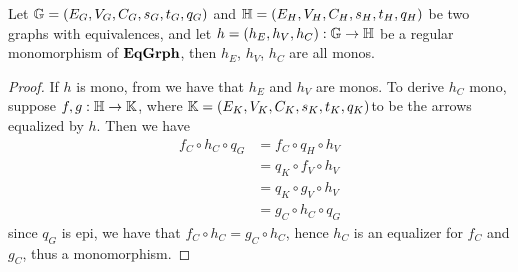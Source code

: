 \begin{cor}\label{cor:regmono}
	Let $\mathbb{G} = (E_G, V_G, C_G, s_G, t_G, q_G)$ and $\mathbb{H} = (E_H, V_H, C_H, s_H, t_H, q_H)$ be two graphs with equivalences,
	and let $ h = (h_E, h_V, h_C): \mathbb{G}\to \mathbb{H} $ be a regular monomorphism of $\mathbf{EqGrph}$, then $h_E$, $h_V$, $h_C$ are all monos.
\end{cor}
\begin{proof}
	If $h$ is mono, from  we have that $h_E$ and $h_V$ are monos. To derive $h_C$ mono, suppose $f, g :  \mathbb{H \to K}$, where $\mathbb{K} = (E_K, V_K, C_K, s_K, t_K, q_K)$to be the arrows equalized by $h$. Then we have
    \begin{align*}
        f_C \circ h_C \circ q_G  &=  f_C \circ q_H \circ h_V \\
                                            &=  q_K \circ f_V \circ h_V \\
                                            &=  q_K \circ g_V \circ h_V \\
                                            &=  g_C \circ h_C \circ q_G
    \end{align*}
    since $q_G$ is epi, we have that $f_C \circ h_C = g_C \circ h_C$, hence $h_C$ is an equalizer for $f_C$ and $g_C$, thus a monomorphism.
	\iffalse

	\smallskip \noindent
        \smallskip \noindent
	$2\Rightarrow 3.$ We note that, by \Cref{cor:kermono}, $(K, \pi_1, \pi_2)$ is the kernel pair of $q_G$ if and only if it is the kernel pair also of $h_C \circ q_G$, since $h_C$ is mono by hypothesis. The thesis follows from $h_C \circ q_G = q_H \circ h_V$, and from the hypothesis of $h_E$ mono.
	
	\smallskip \noindent 
	$3\Rightarrow 1.$\todo{Esercizio} \color{green}{idea: force the comm. of the diagram on the last two components to obtain the two arrows that are equalized, and show that the condition in 3 is sufficient to conclude reg. mono} \color{black}
	\fi
\end{proof}

